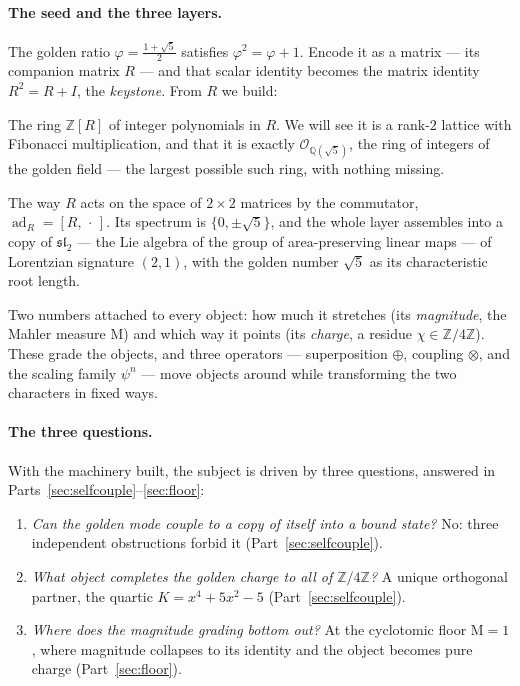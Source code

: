 \documentclass[11pt]{article}
\newcommand{\OK}{𝒪}
\theoremstyle{plain}
\theoremstyle{definition}
\theoremstyle{remark}
\newcommand{\Mah}{\mathrm{M}}
\newcommand{\ad}{\operatorname{ad}}
\begin{document}
\paragraph{The seed and the three layers.} The golden ratio $φ=\tfrac{1+\sqrt5}{2}$ satisfies $φ^{2}=φ+1$. Encode it as a matrix --- its companion matrix $R$ --- and that scalar identity becomes the matrix identity $R^{2}=R+I$, the \emph{keystone}. From $R$ we build:
\begin{description}[leftmargin=1.6em,style=nextline,itemsep=2pt]
\item[The associative core (Part~\ref{sec:core}).] The ring $ℤ[R]$ of integer polynomials in $R$. We will see it is a rank-$2$ lattice with Fibonacci multiplication, and that it is exactly $\OK_{ℚ(\sqrt5)}$, the ring of integers of the golden field --- the largest possible such ring, with nothing missing.
\item[The Lie layer (Part~\ref{sec:lie}).] The way $R$ acts on the space of $2×2$ matrices by the commutator, $\ad_R=[R,\,\cdot\,]$. Its spectrum is $\{0,\pm\sqrt5\}$, and the whole layer assembles into a copy of $𝔰𝔩_2$ --- the Lie algebra of the group of area-preserving linear maps --- of Lorentzian signature $(2,1)$, with the golden number $\sqrt5$ as its characteristic root length.
\item[The semiring layer (Parts~\ref{sec:semiring}--\ref{sec:reps}).] Two numbers attached to every object: how much it stretches (its \emph{magnitude}, the Mahler measure $\Mah$) and which way it points (its \emph{charge}, a residue $χ∈ℤ/4ℤ$). These grade the objects, and three operators --- superposition $⊕$, coupling $⊗$, and the scaling family $ψ^{n}$ --- move objects around while transforming the two characters in fixed ways.
\end{description}

\paragraph{The three questions.} With the machinery built, the subject is driven by three questions, answered in Parts~\ref{sec:selfcouple}--\ref{sec:floor}:
\begin{enumerate}[leftmargin=1.9em,itemsep=1pt]
\item \emph{Can the golden mode couple to a copy of itself into a bound state?} No: three independent obstructions forbid it (Part~\ref{sec:selfcouple}).
\item \emph{What object completes the golden charge to all of $ℤ/4ℤ$?} A unique orthogonal partner, the quartic $K=x^{4}+5x^{2}-5$ (Part~\ref{sec:selfcouple}).
\item \emph{Where does the magnitude grading bottom out?} At the cyclotomic floor $\Mah=1$, where magnitude collapses to its identity and the object becomes pure charge (Part~\ref{sec:floor}).
\end{enumerate}
\end{document}
